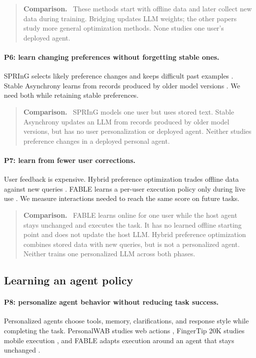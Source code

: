 \documentclass[11pt]{article}
\newenvironment{settingpointer}
  {\begin{quote}\small\noindent\textbf{Comparison.}\ }
  {\end{quote}}
\begin{document}
\begin{settingpointer}
These methods start with offline data and later collect new data during
training.  Bridging updates LLM weights; the other papers study more general
optimization methods.  None studies one user's deployed agent.
\end{settingpointer}

\paragraph{P6: learn changing preferences without forgetting stable ones.}
SPRInG selects likely preference changes and keeps difficult past examples
\citep{kim2026spring}.  Stable Asynchrony learns from records produced by older
model versions \citep{huang2026stable}.  We need both while retaining stable
preferences.

\begin{settingpointer}
SPRInG models one user but uses stored text.  Stable Asynchrony updates an LLM
from records produced by older model versions, but has no user personalization
or deployed agent.  Neither studies preference changes in a deployed personal
agent.
\end{settingpointer}

\paragraph{P7: learn from fewer user corrections.}
User feedback is expensive.  Hybrid preference optimization trades offline
data against new queries \citep{bose2024hybrid}.  FABLE learns a per-user
execution policy only during live use \citep{jin2026fable}.  We measure
interactions needed to reach the same score on future tasks.

\begin{settingpointer}
FABLE learns online for one user while the host agent stays unchanged and
executes the task.  It has no learned offline starting point and does not
update the host LLM.
Hybrid preference optimization combines stored data with new queries, but is
not a personalized agent.  Neither trains one personalized LLM across both
phases.
\end{settingpointer}

\subsection{Learning an agent policy}

\paragraph{P8: personalize agent behavior without reducing task success.}
Personalized agents choose tools, memory, clarifications, and response style
while completing the task.  PersonalWAB studies web actions
\citep{cai2025personalwab}, FingerTip 20K studies mobile execution
\citep{yang2026fingertip}, and FABLE adapts execution around an agent that
stays unchanged
\citep{jin2026fable}.
\end{document}
